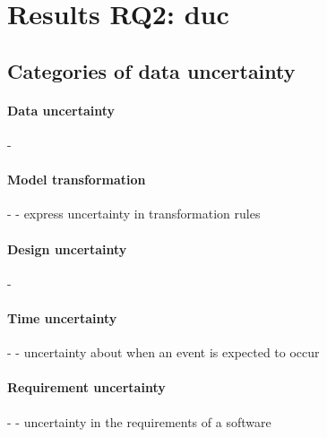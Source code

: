 \section[Results RQ2: data uncertainty]{Results RQ2: \gls{duc}}
\label{sec:sota:results:duc}


\subsection{Categories of data uncertainty}

\paragraph{Data uncertainty}
- \cite{DBLP:conf/models/BurguenoBMV18, baudin2017openturns, DBLP:journals/corr/BorgstromGGMG13, DBLP:conf/ecmdafa/BertoaMBBTV18, DBLP:conf/asplos/BornholtMM14, osti_1430202, DBLP:conf/sle/MayerhoferWV16, DBLP:journals/peerj-cs/SalvatierWF16, DBLP:conf/quatic/VallecilloMO16, DBLP:journals/sosym/Zhang00NO19, DBLP:journals/csi/Hall06, DBLP:journals/infsof/Jimenez-RamirezW0V15, DBLP:conf/ecmdafa/ZhangSAYON16, DBLP:journals/tkde/BarbaraGP92, DBLP:conf/vldb/BenjellounSHW06, DBLP:conf/popl/BhatAVG12}

\paragraph{Model transformation}
- \cite{DBLP:conf/models/BurguenoBMV18, DBLP:conf/sle/EramoPR15, DBLP:conf/icse/EramoPR14}
	- express uncertainty in transformation rules
	
\paragraph{Design uncertainty}
- \cite{DBLP:conf/icse/FamelisSC12, DBLP:journals/sosym/FamelisC19, DBLP:conf/sle/EramoPR15, DBLP:conf/icse/EramoPR14, DBLP:journals/re/SalayCHS13, DBLP:conf/ecmdafa/ZhangSAYON16}

\paragraph{Time uncertainty}
- \cite{DBLP:conf/icst/Garousi08}
	- uncertainty about when an event is expected to occur
	
\paragraph{Requirement uncertainty}
- \cite{DBLP:journals/re/WhittleSBCB10, DBLP:conf/re/WhittleSBCB09, DBLP:journals/re/SalayCHS13}
	- uncertainty in the requirements of a software

